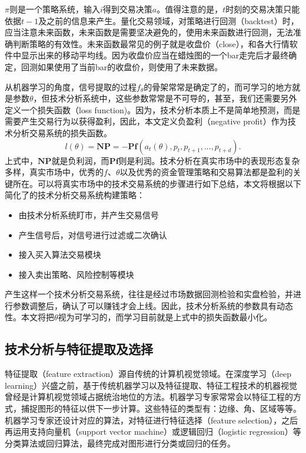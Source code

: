 \documentclass[twoside,longtitle]{LZUthesis}
\begin{document}
$\pi$则是一个策略系统，输入$i$得到交易决策$a$。值得注意的是，$t$时刻的交易决策只能依据$t-1$及之前的信息来产生。量化交易领域，对策略进行回测（backtest）时，应当注意未来函数，未来函数是需要坚决避免的，使用未来函数进行回测，无法准确判断策略的有效性。未来函数最常见的例子就是收盘价（close），和各大行情软件中显示出来的移动平均线。因为收盘价应当在蜡烛图的一个bar走完后才最终确定，回测如果使用了当前bar的收盘价，则使用了未来数据。

从机器学习的角度，信号提取的过程$f_\theta$的骨架常常是确定了的，而可学习的地方就是参数$\theta$，但技术分析系统中，这些参数常常是不可导的，甚至，我们还需要另外定义一个损失函数（loss function)。因为，技术分析本质上不是简单地预测，而是需要产生交易行为以获得盈利，因此，本文定义负盈利（negative profit）作为技术分析交易系统的损失函数。
\[
l(\theta)=\mathbf{NP}=-\mathbf{Pf}\left(a_{t}(\theta), p_{t}, p_{t+1}, ..., p_{t+d}\right).
\]
上式中，$\mathbf{NP}$就是负利润，而$\mathbf{Pf}$则是利润。技术分析在真实市场中的表现形态复杂多样，真实市场中，优秀的$f$、$\theta$以及优秀的资金管理策略和交易算法都是盈利的关键所在。可以将真实市场中的技术交易系统的步骤进行如下总结，本文将根据以下简化了的技术分析交易系统构建策略：
\begin{itemize}
	\item 由技术分析系统盯市，并产生交易信号
	\item 产生信号后，对信号进行过滤或二次确认
	\item 接入买入算法交易模块
	\item 接入卖出策略、风险控制等模块
\end{itemize}
产生这样一个技术分析交易系统，往往是经过市场数据回测检验和实盘检验，并进行参数调整后，确认了可以赚钱才会上线。因此，技术分析系统的参数具有动态性。本文将把$\theta$视为可学习的，而学习目前就是上式中的损失函数最小化。

\subsection{技术分析与特征提取及选择}
特征提取（feature extraction）源自传统的计算机视觉领域。在深度学习（deep learning）兴盛之前，基于传统机器学习以及特征提取、特征工程技术的机器视觉曾经是计算机视觉领域占据统治地位的方法。机器学习专家常常会以特征工程的方式，捕捉图形的特征以供下一步计算。这些特征的类型有：边缘、角、区域等等。机器学习专家还设计对应的算法，对特征进行特征选择（feature selection），之后再运用支持向量机（support vector machine）或逻辑回归（logistic regression）等分类算法或回归算法，最终完成对图形进行分类或回归的任务。
\end{document}
